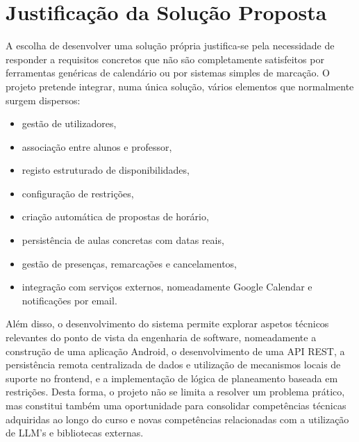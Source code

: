 \section{Justificação da Solução Proposta}

A escolha de desenvolver uma solução própria justifica-se pela necessidade de responder a requisitos concretos que não são completamente satisfeitos por ferramentas
genéricas de calendário ou por sistemas simples de marcação. O projeto pretende integrar, numa única solução, vários elementos que normalmente surgem dispersos:

\begin{itemize}
    \item gestão de utilizadores,
    \item associação entre alunos e professor,
    \item registo estruturado de disponibilidades,
    \item configuração de restrições,
    \item criação automática de propostas de horário,
    \item persistência de aulas concretas com datas reais,
    \item gestão de presenças, remarcações e cancelamentos,
    \item integração com serviços externos, nomeadamente Google Calendar e notificações por email.
\end{itemize}

Além disso, o desenvolvimento do sistema permite explorar aspetos técnicos relevantes do ponto de vista da engenharia de software, nomeadamente a construção de uma
aplicação Android, o desenvolvimento de uma API REST, a persistência remota centralizada de dados e utilização de mecanismos locais de suporte no frontend, e a implementação de lógica de planeamento baseada em restrições.
Desta forma, o projeto não se limita a resolver um problema prático, mas constitui também uma oportunidade para consolidar competências técnicas adquiridas ao longo do curso e novas competências relacionadas com a utilização de LLM's e bibliotecas externas.

